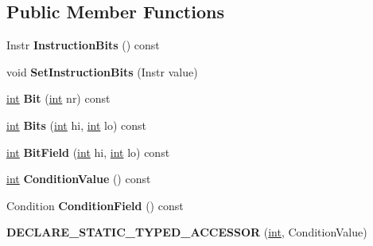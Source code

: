 \subsection*{Public Member Functions}
\begin{DoxyCompactItemize}
\item 
\mbox{\label{classv8_1_1internal_1_1Instruction_a073ca49bc4fd2394c1e75829f49625d1}} 
Instr {\bfseries Instruction\+Bits} () const
\item 
\mbox{\label{classv8_1_1internal_1_1Instruction_a09df19b9577ff4a002c4f775b018d7a0}} 
void {\bfseries Set\+Instruction\+Bits} (Instr value)
\item 
\mbox{\label{classv8_1_1internal_1_1Instruction_aeed143f6d56aee73a4eeca0496f8487d}} 
\mbox{\hyperlink{classint}{int}} {\bfseries Bit} (\mbox{\hyperlink{classint}{int}} nr) const
\item 
\mbox{\label{classv8_1_1internal_1_1Instruction_a7a87cc79130522edf745bc8be42b08ea}} 
\mbox{\hyperlink{classint}{int}} {\bfseries Bits} (\mbox{\hyperlink{classint}{int}} hi, \mbox{\hyperlink{classint}{int}} lo) const
\item 
\mbox{\label{classv8_1_1internal_1_1Instruction_a097f739f4e9326b14dbaa8db07d7f375}} 
\mbox{\hyperlink{classint}{int}} {\bfseries Bit\+Field} (\mbox{\hyperlink{classint}{int}} hi, \mbox{\hyperlink{classint}{int}} lo) const
\item 
\mbox{\label{classv8_1_1internal_1_1Instruction_aa9c0c2e647cd52174357581e5d94f0af}} 
\mbox{\hyperlink{classint}{int}} {\bfseries Condition\+Value} () const
\item 
\mbox{\label{classv8_1_1internal_1_1Instruction_aaa4b71c953e2b1435f5a2228647d0b59}} 
Condition {\bfseries Condition\+Field} () const
\item 
\mbox{\label{classv8_1_1internal_1_1Instruction_a2dc55a146a8d735c7cbd3f9340d03d47}} 
{\bfseries D\+E\+C\+L\+A\+R\+E\+\_\+\+S\+T\+A\+T\+I\+C\+\_\+\+T\+Y\+P\+E\+D\+\_\+\+A\+C\+C\+E\+S\+S\+OR} (\mbox{\hyperlink{classint}{int}}, Condition\+Value)

\end{DoxyCompactItemize}

